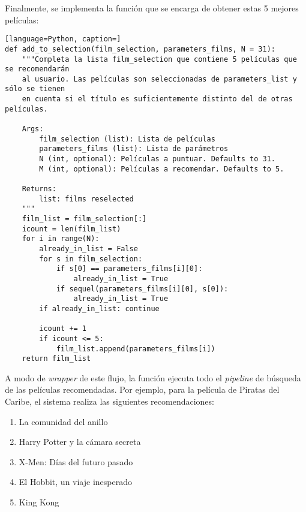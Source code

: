 Finalmente, se implementa la función que se encarga de obtener estas 5 mejores películas:

\begin{lstlisting}[language=Python, caption=]
def add_to_selection(film_selection, parameters_films, N = 31):
    """Completa la lista film_selection que contiene 5 películas que se recomendarán
    al usuario. Las películas son seleccionadas de parameters_list y sólo se tienen
    en cuenta si el título es suficientemente distinto del de otras películas.

    Args:
        film_selection (list): Lista de películas
        parameters_films (list): Lista de parámetros
        N (int, optional): Películas a puntuar. Defaults to 31.
        M (int, optional): Películas a recomendar. Defaults to 5.

    Returns:
        list: films reselected
    """
    film_list = film_selection[:]
    icount = len(film_list)    
    for i in range(N):
        already_in_list = False
        for s in film_selection:
            if s[0] == parameters_films[i][0]: 
                already_in_list = True
            if sequel(parameters_films[i][0], s[0]): 
                already_in_list = True            
        if already_in_list: continue
            
        icount += 1
        if icount <= 5:
            film_list.append(parameters_films[i])
    return film_list
\end{lstlisting}

A modo de \textit{wrapper} de este flujo, la función  ejecuta todo el \textit{pipeline} de búsqueda de las películas recomendadas. Por ejemplo, para la película de Piratas del Caribe, el sistema realiza las siguientes recomendaciones:

\begin{enumerate}
    \item La comunidad del anillo
    \item Harry Potter y la cámara secreta
    \item X-Men: Días del futuro pasado
    \item El Hobbit, un viaje inesperado
    \item King Kong
\end{enumerate}

